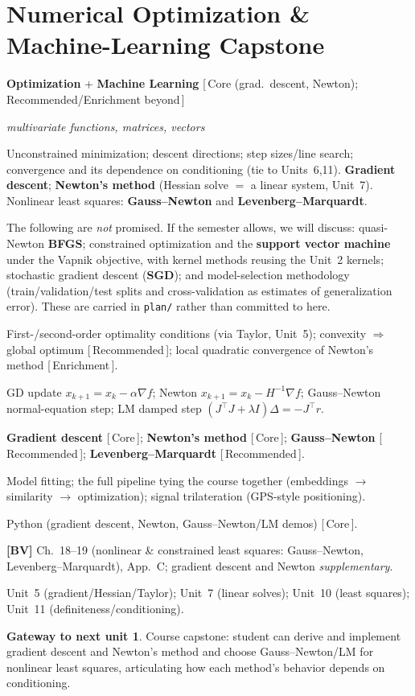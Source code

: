 \documentclass[11pt]{article}
\newcommand{\dom}[1]{{\sffamily\bfseries\color{RoyalBlue}#1}}
\newcommand{\pri}[1]{{\footnotesize\sffamily\color{BrickRed}[\,#1\,]}}
\newcommand{\obj}[1]{{\itshape #1}}
\newenvironment{unitfields}
  {\begin{description}[leftmargin=0pt,labelindent=0pt,style=nextline,
      font=\normalfont\sffamily\bfseries\color{RoyalBlue},itemsep=3pt,topsep=4pt]}
  {\end{description}}
\newcommand{\ff}[1]{\item[#1]}
\theoremstyle{definition}
\newtheorem*{gateway}{Gateway to next unit}
\begin{document}
\section{Numerical Optimization \& Machine-Learning Capstone}
\begin{unitfields}
\ff{Domain(s)} \dom{Optimization} + \dom{Machine Learning} \pri{Core (grad.\ descent, Newton); Recommended/Enrichment beyond}
\ff{Primary object(s)} \obj{multivariate functions, matrices, vectors}
\ff{Topics}
  Unconstrained minimization; descent directions; step sizes/line search;
  convergence and its dependence on conditioning (tie to Units~6,11).
  \textbf{Gradient descent}; \textbf{Newton's method} (Hessian solve $=$ a
  linear system, Unit~7). Nonlinear least squares: \textbf{Gauss--Newton} and
  \textbf{Levenberg--Marquardt}.
\ff{If time permits}
  The following are \emph{not} promised. If the semester allows, we will
  discuss: quasi-Newton \textbf{BFGS}; constrained optimization and the
  \textbf{support vector machine} under the Vapnik objective, with kernel
  methods reusing the Unit~2 kernels; stochastic gradient descent
  (\textbf{SGD}); and model-selection methodology (train/validation/test splits
  and cross-validation as estimates of generalization error). These are carried
  in \texttt{plan/} rather than committed to here.
\ff{Key theorems}
  First-/second-order optimality conditions (via Taylor, Unit~5);
  convexity $\Rightarrow$ global optimum \pri{Recommended};
  local quadratic convergence of Newton's method \pri{Enrichment}.
\ff{Tools / formulas}
  GD update $x_{k+1}=x_k-\alpha\nabla f$; Newton
  $x_{k+1}=x_k-H^{-1}\nabla f$; Gauss--Newton normal-equation step;
  LM damped step $(J^\top J+\lambda I)\Delta=-J^\top r$.
\ff{Algorithms}
  \textbf{Gradient descent} \pri{Core}; \textbf{Newton's method} \pri{Core};
  \textbf{Gauss--Newton} \pri{Recommended};
  \textbf{Levenberg--Marquardt} \pri{Recommended}.
\ff{Applications}
  Model fitting; the full pipeline tying the course together
  (embeddings $\to$ similarity $\to$ optimization); signal trilateration
  (GPS-style positioning).
\ff{Languages}
  Python (gradient descent, Newton, Gauss--Newton/LM demos) \pri{Core}.
\ff{Textbook refs}
  \textbf{[BV]} Ch.~18--19 (nonlinear \& constrained least squares:
  Gauss--Newton, Levenberg--Marquardt), App.~C;
  gradient descent and Newton \emph{supplementary}.
\ff{ENTER} Unit~5 (gradient/Hessian/Taylor); Unit~7 (linear solves); Unit~10 (least squares); Unit~11 (definiteness/conditioning).
\end{unitfields}
\begin{gateway}
Course capstone: student can derive and implement gradient descent and Newton's
method and choose Gauss--Newton/LM for nonlinear least squares, articulating how
each method's behavior depends on conditioning.
\end{gateway}
\end{document}
